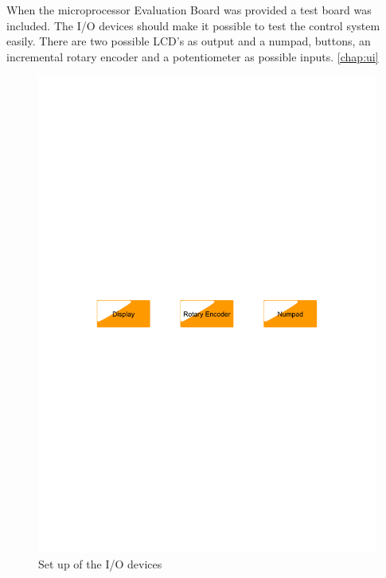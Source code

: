 When the microprocessor Evaluation Board was provided a test board was included. The I/O devices should make it possible to test the control system easily. There are two possible LCD's as output and a numpad, buttons, an incremental rotary encoder and a potentiometer as possible inputs. \ref{chap:ui}
\begin{figure}[htb]
	\centering
	\includegraphics[scale=0.3,clip,trim=00 400 00 400]{graphics/iodevices} %
	\caption{Set up of the I/O devices}
	\label{fig:iodevices}			%
\end{figure}


